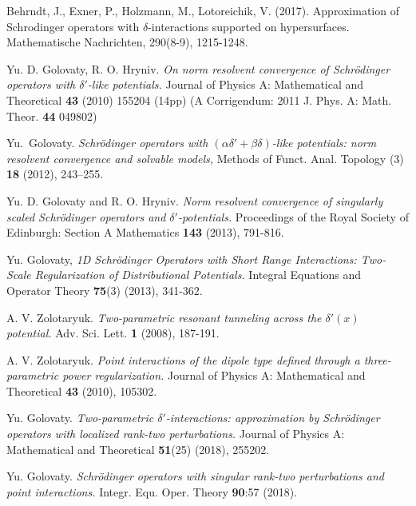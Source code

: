 \documentclass[reqno]{amsart}
\theoremstyle{plain}
\numberwithin{equation}{section}
\begin{document}
\begin{thebibliography}{10}
Behrndt, J., Exner, P., Holzmann, M.,  Lotoreichik, V. (2017). Approximation of Schrodinger operators with $\delta$-interactions supported on hypersurfaces. Mathematische Nachrichten, 290(8-9), 1215-1248.


    Yu. D. Golovaty,  R. O. Hryniv.
    \textit{On norm resolvent convergence of Schr\"{o}dinger
    operators with $\delta'$-like potentials.}
   Journal of Physics A: Mathematical and Theoretical \textbf{43} (2010) 155204 (14pp) (A Corrigendum: 2011 J. Phys. A: Math. Theor. \textbf{44} 049802)

    Yu.~Golovaty.
    \textit{Schr\"{o}dinger operators with  $(\alpha\delta'+\beta \delta)$-like potentials: norm resolvent convergence and solvable models,} Methods of Funct. Anal. Topology (3) \textbf{18} (2012), 243--255.

 Yu. D. Golovaty and R. O. Hryniv. \textit{Norm resolvent convergence of singularly scaled Schr\"{o}dinger operators and $\delta'$-potentials.} Proceedings of the Royal Society of Edinburgh: Section A Mathematics \textbf{143} (2013),  791-816.

    Yu. Golovaty, \textit{1D Schr\"{o}dinger Operators with Short Range Interactions: Two-Scale Regularization of Distributional Potentials.} Integral Equations and Operator Theory \textbf{75}(3) (2013),   341-362.


    A. V. Zolotaryuk.
    \textit{Two-parametric resonant tunneling across the $\delta'(x)$ potential.}
    Adv. Sci. Lett. {\bf 1} (2008), 187-191.

    A. V. Zolotaryuk.
    \textit{Point interactions of the dipole type defined through a three-parametric power regularization.}
    Journal of Physics A: Mathematical and Theoretical {\bf 43} (2010), 105302.

	Yu. Golovaty.
	\textit{Two-parametric  $\delta'$-interactions: approximation by
 	Schr\"{o}dinger operators with localized rank-two perturbations.}
 	Journal of Physics A: Mathematical and Theoretical \textbf{51}(25) (2018), 255202.

	Yu. Golovaty.
	\textit{Schr\"{o}dinger operators with singular rank-two perturbations and point interactions.}
	Integr. Equ. Oper. Theory \textbf{90}:57 (2018).
\end{thebibliography}
\end{document}
